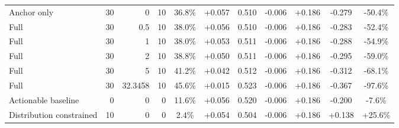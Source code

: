 \begin{table}[htbp]
\begin{tabular}{lrrrccccccc}
Anchor only & 30 & 0 & 10 & 36.8\% & +0.057 & 0.510 & -0.006 & +0.186 & -0.279 & -50.4\% \\
Full & 30 & 0.5 & 10 & 38.0\% & +0.056 & 0.510 & -0.006 & +0.186 & -0.283 & -52.4\% \\
Full & 30 & 1 & 10 & 38.0\% & +0.053 & 0.511 & -0.006 & +0.186 & -0.288 & -54.9\% \\
Full & 30 & 2 & 10 & 38.8\% & +0.050 & 0.511 & -0.006 & +0.186 & -0.295 & -59.0\% \\
Full & 30 & 5 & 10 & 41.2\% & +0.042 & 0.512 & -0.006 & +0.186 & -0.312 & -68.1\% \\
Full & 30 & 32.3458 & 10 & 45.6\% & +0.015 & 0.523 & -0.006 & +0.186 & -0.367 & -97.6\% \\
Actionable baseline & 0 & 0 & 0 & 11.6\% & +0.056 & 0.520 & -0.006 & +0.186 & -0.200 & -7.6\% \\
Distribution constrained & 10 & 0 & 0 & 2.4\% & +0.054 & 0.504 & -0.006 & +0.186 & +0.138 & +25.6\% \\
\bottomrule
\end{tabular}
\end{table}